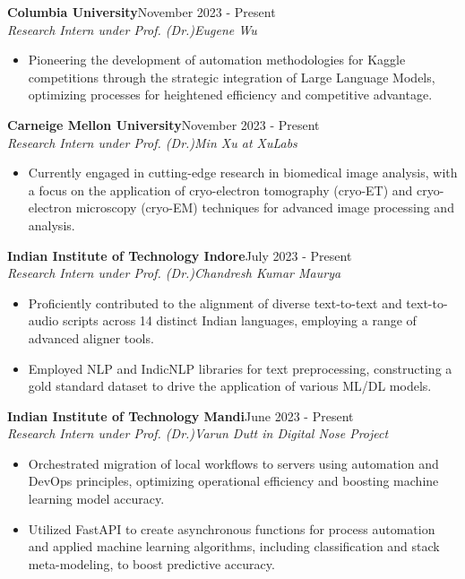 \documentclass[a4paper]{article}
\begin{document}
{\textbf{Columbia University}}\hfill November 2023 - Present \\
 {\textit{Research Intern under Prof. (Dr.)Eugene Wu }}  \
\vspace{-2mm}
\begin{itemize} 
\item Pioneering the development of automation methodologies for Kaggle competitions through the strategic integration of Large Language Models, optimizing processes for heightened efficiency and competitive advantage.
\end{itemize}
\vspace{-1.5mm}
{\textbf{Carneige Mellon University}}\hfill November 2023 - Present \\
 {\textit{Research Intern under Prof. (Dr.)Min Xu at XuLabs}}  \
\vspace{-2mm}
\begin{itemize} 
\item Currently engaged in cutting-edge research in biomedical image analysis, with a focus on the application of cryo-electron tomography (cryo-ET) and cryo-electron microscopy (cryo-EM) techniques for advanced image processing and analysis.
\end{itemize}
\vspace{-2mm}
{\textbf{Indian Institute of Technology Indore}}\hfill July 2023 - Present \\
 {\textit{Research Intern under Prof. (Dr.)Chandresh Kumar Maurya }}  \
\vspace{-2mm}
\begin{itemize} 
\item Proficiently contributed to the alignment of diverse text-to-text and text-to-audio scripts across 14 distinct Indian languages, employing a range of advanced aligner tools.  
\vspace{-2.5mm}
\item Employed NLP and IndicNLP libraries for text preprocessing, constructing a gold standard dataset to drive the application of various ML/DL models.
\end{itemize}
\vspace{-1.5mm}
{\textbf{Indian Institute of Technology Mandi}}\hfill June 2023 - Present \\
 {\textit{Research Intern under Prof. (Dr.)Varun Dutt in Digital Nose Project}}  \
\vspace{-2mm}
\begin{itemize} 
\item Orchestrated migration of local workflows to servers using automation and DevOps principles, optimizing operational efficiency and boosting machine learning model accuracy. 
\vspace{-2mm}
\item Utilized FastAPI to create asynchronous functions for process automation and applied machine learning algorithms, including classification and stack meta-modeling, to boost predictive accuracy.
\end{itemize}
\end{document}

